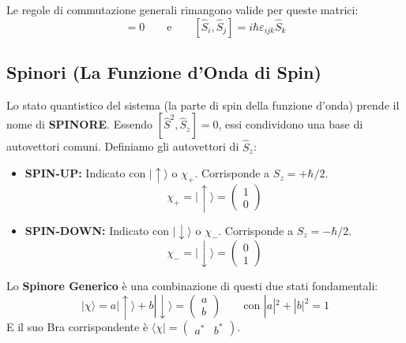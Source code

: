 \documentclass[11pt, a4paper]{article}
\begin{document}
Le regole di commutazione generali rimangono valide per queste matrici: %
\begin{equation*}
    [\hat{S}^2, \hat{S}_i] = 0 \qquad \text{e} \qquad [\hat{S}_i, \hat{S}_j] = i\hbar\varepsilon_{ijk}\hat{S}_k %
\end{equation*}

\subsection{Spinori (La Funzione d'Onda di Spin)} %

Lo stato quantistico del sistema (la parte di spin della funzione d'onda) prende il nome di \textbf{SPINORE}. %
Essendo $[\hat{S}^2, \hat{S}_z] = 0$, essi condividono una base di autovettori comuni. Definiamo gli autovettori di $\hat{S}_z$: %

\begin{itemize}
    \item \textbf{SPIN-UP:} Indicato con $|\uparrow\rangle$ o $\chi_+$. Corrisponde a $S_z = +\hbar/2$. %
    \begin{equation*}
        \chi_+ = |\uparrow\rangle = \begin{pmatrix} 1 \\ 0 \end{pmatrix} %
    \end{equation*}
    \item \textbf{SPIN-DOWN:} Indicato con $|\downarrow\rangle$ o $\chi_-$. Corrisponde a $S_z = -\hbar/2$. %
    \begin{equation*}
        \chi_- = |\downarrow\rangle = \begin{pmatrix} 0 \\ 1 \end{pmatrix} %
    \end{equation*}
\end{itemize}

Lo \textbf{Spinore Generico} è una combinazione di questi due stati fondamentali: %
\begin{equation}
    |\chi\rangle = a |\uparrow\rangle + b |\downarrow\rangle = \begin{pmatrix} a \\ b \end{pmatrix} \qquad \text{con } |a|^2 + |b|^2 = 1 %
\end{equation}
E il suo Bra corrispondente è $\langle\chi| = \begin{pmatrix} a^* & b^* \end{pmatrix}$. %
\end{document}
